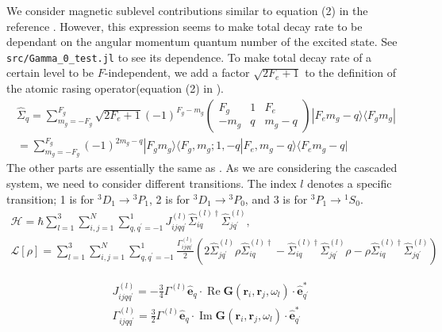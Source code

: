 \documentclass{article}
\begin{document}
We consider magnetic sublevel contributions similar to equation (2) in the reference \cite{asenjo-garciaOpticalWaveguidingAtomic2019}. However, this expression seems to make total decay rate to be dependant on the angular momentum quantum number of the excited state. See \texttt{src/Gamma\_0\_test.jl} to see its dependence. To make total decay rate of a certain level to be $F$-independent, we add a factor $\sqrt{2F_e + 1}$ to the definition of the atomic rasing operator(equation (2) in \cite{asenjo-garciaOpticalWaveguidingAtomic2019}).
$$\begin{gathered}
\hat{\Sigma}_q = \sum_{m_g = -F_g}^{F_g}  \sqrt{2F_e + 1} (-1)^{F_g-m_g}\left(\begin{array}{llc}
F_g & 1 & F_e \\
-m_g & q & m_g-q
\end{array}\right) |F_e m_g-q\rangle \langle F_g m_g |  \\
= \sum_{m_g = -F_g}^{F_g} (-1)^{2m_g - q} |F_g m_g \rangle \langle F_g, m_g; 1, -q| F_e, m_g - q \rangle \langle F_e m_g - q |
\end{gathered}$$
The other parts are essentially the same as \cite{asenjo-garciaOpticalWaveguidingAtomic2019}. As we are considering the cascaded system, we need to consider different transitions. The index $l$ denotes a specific transition; 1 is for $^3D_1 \rightarrow {}^3P_1$, 2 is for $^3D_1 \rightarrow {}^3P_0$, and 3 is for $^3P_1 \rightarrow {}^1S_0$.
$$\begin{gathered}
\mathcal{H} = \hbar \sum_{l=1}^{3}\sum_{i, j=1}^N \sum_{q, q^{\prime}=-1}^1 J_{i j q q^{\prime}}^{(l)} \hat{\Sigma}_{i q}^{(l)\dagger} \hat{\Sigma}_{j q^{\prime}}^{(l)}, \\ 
\mathcal{L}[\rho] = \sum_{l=1}^{3}\sum_{i, j=1}^N \sum_{q, q^{\prime}=-1}^1 \frac{\Gamma_{i j q q^{\prime}}^{(l)}}{2}\left(2 \hat{\Sigma}_{j q^{\prime}}^{(l)} \rho \hat{\Sigma}_{i q}^{(l)\dagger}-\hat{\Sigma}_{i q}^{(l)\dagger} \hat{\Sigma}_{j q^{\prime}}^{(l)} \rho -\rho \hat{\Sigma}_{i q}^{(l)\dagger} \hat{\Sigma}_{j q^{\prime}}^{(l)}\right)
\end{gathered}$$

$$
\begin{aligned}
& J_{i j q q^{\prime}}^{(l)} = -\frac{3}{4}\Gamma^{(l)} \hat{\mathbf{e}}_q \cdot \operatorname{Re} \mathbf{G}\left(\mathbf{r}_i, \mathbf{r}_j, \omega_l\right) \cdot \hat{\mathbf{e}}_{q^{\prime}}^* \\
& \Gamma_{i j q q^{\prime}}^{(l)} = \frac{3}{2}\Gamma^{(l)}  \hat{\mathbf{e}}_q \cdot \operatorname{Im} \mathbf{G}\left(\mathbf{r}_i, \mathbf{r}_j, \omega_l\right) \cdot \hat{\mathbf{e}}_{q^{\prime}}^*
\end{aligned}
$$
\end{document}

